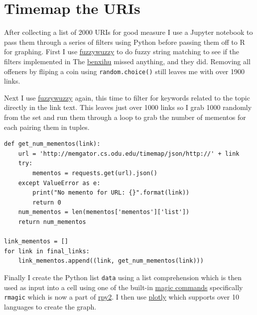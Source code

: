 \documentclass[12pt, a4paper]{article}
\newcommand{\code}[1]{\texttt{#1}}
\begin{document}
%
%
\section{Timemap the URIs}

After collecting a list of 2000 URIs for good measure I use a Jupyter
notebook to pass them through a series of filters using Python before
passing them off to R for graphing. First I use 
\href{https://github.com/seatgeek/fuzzywuzzy}{fuzzywuzzy} 
to do fuzzy string matching to see if the filters implemented in
The \href{https://gitlab.com/datenstrom/cs532-s17}{benxihu}
missed anything, and they did. Removing all offeners by fliping a
coin using \code{random.choice()} still leaves me with over 1900
links.

Next I use \href{https://github.com/seatgeek/fuzzywuzzy}{fuzzywuzzy}
again, this time to filter for keywords related to the topic directly
in the link text. This leaves just over 1000 links so I grab 1000
randomly from the set and run them through a loop to grab the number
of mementos for each pairing them in tuples.

\begin{minipage}{\linewidth} %
\vspace{2em}
\begin{verbatim}
def get_num_mementos(link):
    url = 'http://memgator.cs.odu.edu/timemap/json/http://' + link
    try:
        mementos = requests.get(url).json()
    except ValueError as e:
        print("No memento for URL: {}".format(link))
        return 0
    num_mementos = len(mementos['mementos']['list'])
    return num_mementos

link_mementos = []
for link in final_links:
    link_mementos.append((link, get_num_mementos(link)))
\end{verbatim}
\end{minipage}

\newpage
Finally I create the Python list \code{data} using a list comprehension
 which is then used as input into a cell using one of the built-in
\href{http://ipython.readthedocs.io/en/stable/interactive/magics.html?highlight=magic}{magic commands}
specifically \code{rmagic} which is now a part of 
\href{https://rpy2.bitbucket.io/}{rpy2}.
I then use \href{https://plot.ly}{plotly} which supports over 10
languages to create the graph.
\end{document}
